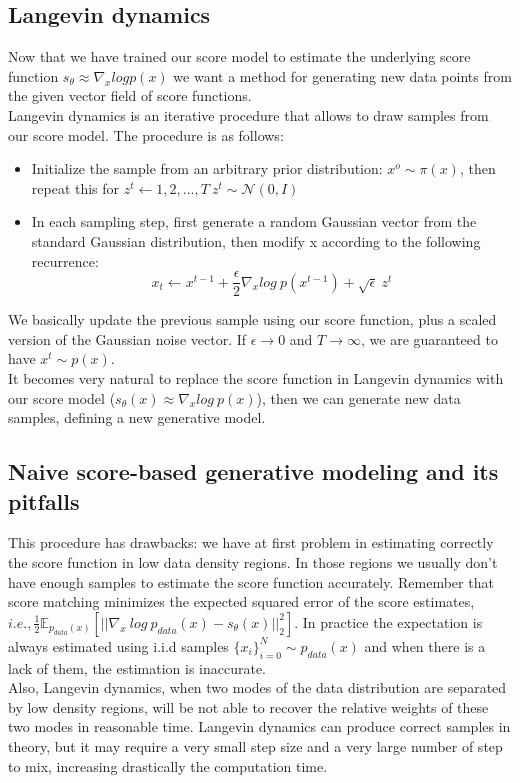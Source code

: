 \documentclass{article}
\begin{document}
   \subsection{Langevin dynamics}
   Now that we have trained our score model to estimate the underlying score function $s_{\theta} \approx \nabla_{x} log p(x)$ we want a method for generating new data points from the given vector field of score functions.\\
   Langevin dynamics is an iterative procedure that allows to draw samples from our score model. The procedure is as follows:
   \begin{itemize}
   	\item Initialize the sample from an arbitrary prior distribution: $x^{o} \sim \pi(x)$, then repeat this for $z^{t} \leftarrow 1,2,...,T\ z^{t} \sim \mathcal{N}(0,I)$
	\item In each sampling step, first generate a random Gaussian vector from the standard Gaussian distribution, then modify x according to the following recurrence:
	\begin{equation}
	x_{t} \leftarrow x^{t-1} + \frac{\epsilon}{2} \nabla_{x} log\ p(x^{t-1})+\sqrt{\epsilon}\ z^{t}
	\end{equation}
   \end{itemize}
   We basically update the previous sample using our score function, plus a scaled version of the Gaussian noise vector. If $\epsilon \rightarrow 0$ and $T \rightarrow \infty$, we are guaranteed to have $x^{t} \sim p(x)$.\\
   It becomes very natural to replace the score function in Langevin dynamics with our score model ($s_{\theta}(x) \approx \nabla_{x}log\ p(x)$), then we can generate new data samples, defining a new generative model.
   \newline
   \subsection{Naive score-based generative modeling and its pitfalls}
   This procedure has drawbacks: we have at first problem in estimating correctly the score function in low data density regions. In those regions we usually don't have enough samples to estimate the score function accurately. Remember that score matching minimizes the expected squared error of the score estimates, $i.e., \frac{1}{2}\mathbb{E}_{p_{data}(x)}[||\nabla_{x}\ log\ p_{data}(x) - s_{\theta}(x) ||_{2}^{2}]$. In practice the expectation is always estimated using i.i.d samples $\{ x_{i}\}_{i=0}^{N} \sim p_{data}(x)$ and when there is a lack of them, the estimation is inaccurate.\\
   \newline
    Also, Langevin dynamics,  when two modes of the data distribution are separated by low density regions, will be not able to recover the relative weights of these two modes in reasonable time. Langevin dynamics can produce correct samples in theory, but it may require a very small step size and  a very large number of step to mix, increasing drastically the computation time.
    \newpage
\end{document}
